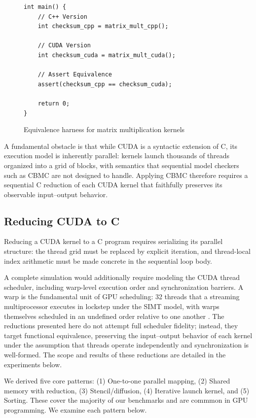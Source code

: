 \documentclass{article}
\begin{document}
\begin{figure}[H]
\begin{verbatim}
int main() {
    // C++ Version
    int checksum_cpp = matrix_mult_cpp();

    // CUDA Version
    int checksum_cuda = matrix_mult_cuda();

    // Assert Equivalence
    assert(checksum_cpp == checksum_cuda);

    return 0;
}
\end{verbatim}
\caption{Equivalence harness for matrix multiplication kernels}
\label{fig:cbmc-matmult-harness}
\end{figure}

A fundamental obstacle is that while CUDA is a syntactic extension of C, its execution model is inherently parallel: kernels launch thousands of threads organized into a grid of blocks, with semantics that sequential model checkers such as CBMC are not designed to handle. Applying CBMC therefore requires a sequential C reduction of each CUDA kernel that faithfully preserves its observable input--output behavior.

\subsection{Reducing CUDA to C}

Reducing a CUDA kernel to a C program requires serializing its parallel structure: the thread grid must be replaced by explicit iteration, and thread-local index arithmetic must be made concrete in the sequential loop body.

A complete simulation would additionally require modeling the CUDA thread scheduler, including warp-level execution order and synchronization barriers. A warp is the fundamental unit of GPU scheduling: 32 threads that a streaming multiprocessor executes in lockstep under the SIMT model, with warps themselves scheduled in an undefined order relative to one another \cite{kirk2010programming}. The reductions presented here do not attempt full scheduler fidelity; instead, they target functional equivalence, preserving the input--output behavior of each kernel under the assumption that threads operate independently and synchronization is well-formed. The scope and results of these reductions are detailed in the experiments below.

We derived five core patterns: (1) One-to-one parallel mapping, (2) Shared memory with reduction, (3) Stencil/diffusion, (4) Iterative launch kernel, and (5) Sorting. These cover the majority of our benchmarks and are commmon in GPU programming. We examine each pattern below.
\end{document}

